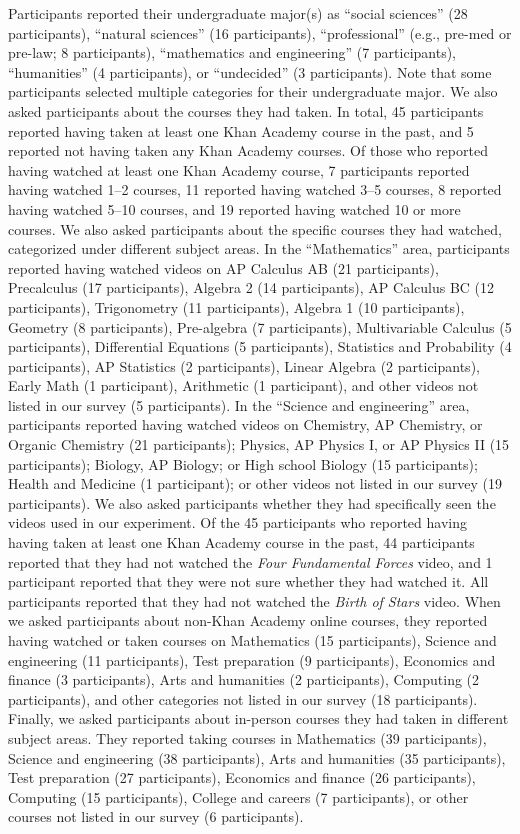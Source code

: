\documentclass[10pt]{article}
\begin{document}
Participants reported their undergraduate major(s) as ``social sciences'' (28
participants), ``natural sciences'' (16 participants), ``professional'' (e.g.,
pre-med or pre-law; 8 participants), ``mathematics and engineering'' (7
participants), ``humanities'' (4 participants), or ``undecided'' (3
participants). Note that some participants selected multiple categories for
their undergraduate major. We also asked participants about the courses they
had taken. In total, 45 participants reported having taken at least one Khan
Academy course in the past, and 5 reported not having taken any Khan Academy
courses. Of those who reported having watched at least one Khan Academy course,
7 participants reported having watched 1--2 courses, 11 reported having watched
3--5 courses, 8 reported having watched 5--10 courses, and 19 reported having
watched 10 or more courses. We also asked participants about the specific
courses they had watched, categorized under different subject areas. In the
``Mathematics'' area, participants reported having watched videos on AP
Calculus AB (21 participants), Precalculus (17 participants), Algebra 2 (14
participants), AP Calculus BC (12 participants), Trigonometry (11
participants), Algebra 1 (10 participants), Geometry (8 participants),
Pre-algebra (7 participants), Multivariable Calculus (5 participants),
Differential Equations (5 participants), Statistics and Probability (4
participants), AP Statistics (2 participants), Linear Algebra (2 participants),
Early Math (1 participant), Arithmetic (1 participant), and other videos not
listed in our survey (5 participants). In the ``Science and engineering'' area,
participants reported having watched videos on Chemistry, AP Chemistry, or
Organic Chemistry (21 participants); Physics, AP Physics I, or AP Physics II
(15 participants); Biology, AP Biology; or High school Biology (15
participants); Health and Medicine (1 participant); or other videos not listed
in our survey (19 participants). We also asked participants whether they had
specifically seen the videos used in our experiment. Of the 45 participants who
reported having having taken at least one Khan Academy course in the past, 44
participants reported that they had not watched the \textit{Four Fundamental
Forces} video, and 1 participant reported that they were not sure whether they
had watched it. All participants reported that they had not watched the
\textit{Birth of Stars} video. When we asked participants about non-Khan
Academy online courses, they reported having watched or taken courses on
Mathematics (15 participants), Science and engineering (11 participants), Test
preparation (9 participants), Economics and finance (3 participants), Arts and
humanities (2 participants), Computing (2 participants), and other categories
not listed in our survey (18 participants). Finally, we asked participants
about in-person courses they had taken in different subject areas. They
reported taking courses in Mathematics (39 participants), Science and
engineering (38 participants), Arts and humanities (35 participants), Test
preparation (27 participants), Economics and finance (26 participants),
Computing (15 participants), College and careers (7 participants), or other
courses not listed in our survey (6 participants).
\end{document}
